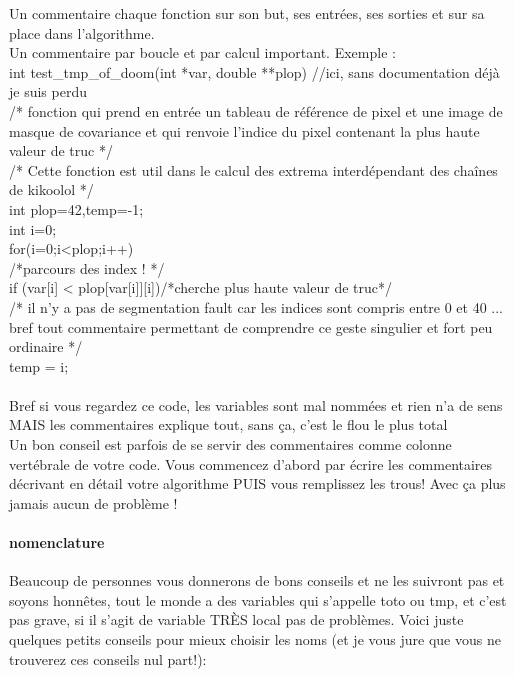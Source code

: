 \documentclass[a4paper,10pt]{book_ad}
\begin{document}
Un commentaire chaque fonction sur son but, ses entrées, ses sorties et sur sa place dans l'algorithme. \\

Un commentaire par boucle et par calcul important. Exemple :\\

int test\_tmp\_of\_doom(int *var, double **plop) //ici, sans documentation déjà je suis perdu \\ 
/* fonction qui prend en entrée un tableau de référence de pixel et une image de masque de covariance
 et qui renvoie l'indice du pixel contenant la plus haute valeur de truc */\\
/* Cette fonction est util dans le calcul des extrema interdépendant des chaînes de kikoolol */\\

int plop=42,temp=-1;\\
int i=0;\\

for(i=0;i<plop;i++){\\ 
/*parcours des index ! */\\
if (var[i] < plop[var[i]][i])/*cherche plus haute valeur de truc*/\\
/* il n'y a pas de segmentation fault car les indices sont compris entre 0 et 40 ... bref tout
 commentaire permettant de comprendre ce geste singulier et fort peu ordinaire */\\
temp = i;\\
}\\

Bref si vous regardez ce code, les variables sont mal nommées et rien n'a de sens MAIS les
 commentaires explique tout, sans ça, c'est le flou le plus total\\
Un bon conseil est parfois de se servir des commentaires comme colonne vertébrale de votre 
code. Vous commencez d'abord par écrire les commentaires décrivant en détail votre algorithme 
PUIS vous remplissez les trous! Avec ça plus jamais aucun de problème ! \\

\paragraph{nomenclature}

Beaucoup de personnes vous donnerons de bons conseils et ne les suivront pas et soyons honnêtes, 
tout le monde a des variables qui s'appelle toto ou tmp, et c'est pas grave, si il s'agit de 
variable TRÈS local pas de problèmes. Voici juste quelques petits conseils pour mieux choisir 
les noms (et je vous jure que vous ne trouverez ces conseils nul part!):\\
\end{document}
